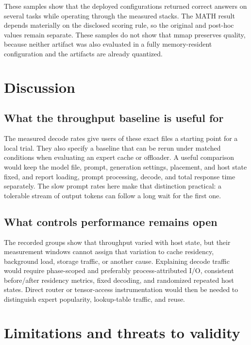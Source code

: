 \documentclass[11pt]{article}
\begin{document}
These samples show that the deployed configurations returned correct answers
on several tasks while operating through the measured stacks. The MATH result
depends materially on the disclosed scoring rule, so the original and post-hoc
values remain separate. These samples do not show that mmap preserves quality,
because neither artifact was also evaluated in a fully memory-resident
configuration and the artifacts are already quantized.

\section{Discussion}

\subsection{What the throughput baseline is useful for}

The measured decode rates give users of these exact files a starting point
for a local trial. They also specify a baseline that can be rerun under matched
conditions when evaluating an expert cache or offloader. A useful comparison
would keep the model file, prompt, generation settings, placement, and host
state fixed, and report loading, prompt processing, decode, and total response
time separately. The slow prompt rates here make that distinction practical:
a tolerable stream of output tokens can follow a long wait for the first one.

\subsection{What controls performance remains open}

The recorded groups show that throughput varied with host state, but their
measurement windows cannot assign that variation to cache residency,
background load, storage traffic, or another cause. Explaining decode traffic
would require phase-scoped and preferably process-attributed I/O, consistent
before/after residency metrics, fixed decoding, and randomized repeated host
states. Direct router or tensor-access instrumentation would then be needed to
distinguish expert popularity, lookup-table traffic, and reuse.

\section{Limitations and threats to validity}
\end{document}
